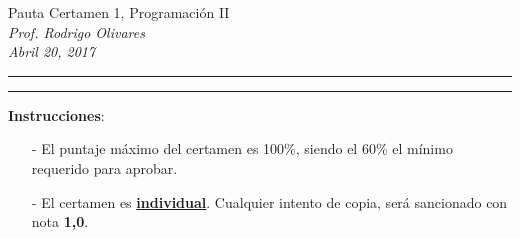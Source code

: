 \documentclass[10pt]{article}
\begin{document}
\begin{center}
    {\Large Pauta Certamen 1, Programaci\'on II} \\
    \emph{\small Prof. Rodrigo Olivares} \\
    \emph{\scriptsize Abril 20, 2017}
\end{center}
\vspace*{-35pt}
\begin{center}
    \rule{1\textwidth}{.3pt}
\end{center}
\vspace*{-42pt}
\begin{center}
    \rule{1\textwidth}{2pt}
\end{center}

\vspace*{-15pt}
{\small \textbf{Instrucciones}:}
\vspace*{-15pt}

{\scriptsize
\begin{itemize}
    \item[-] El puntaje m\'aximo del certamen es 100\%, siendo el 60\% el m\'inimo requerido para aprobar.
    \item[-] El certamen es \underline{\textbf{individual}}. Cualquier intento de copia, ser\'a sancionado con nota \textbf{1,0}.
\end{itemize}
}
\vspace*{10pt}

\vspace*{-30pt}
\end{document}
